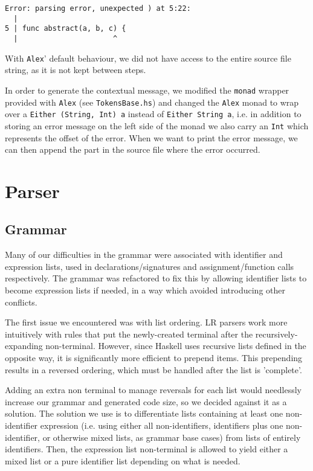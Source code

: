 \documentclass[11pt]{article}
\begin{document}
\begin{verbatim}
Error: parsing error, unexpected ) at 5:22:
  |
5 | func abstract(a, b, c) {
  |                      ^
\end{verbatim}

With \texttt{Alex}' default behaviour, we did not have access to the entire
source file string, as it is not kept between steps.

In order to generate the contextual message, we modified the \texttt{monad}
wrapper provided with \texttt{Alex} (see \texttt{TokensBase.hs}) and changed the
\texttt{Alex} monad to wrap over a \texttt{Either (String, Int) a} instead of
\texttt{Either String a}, i.e. in addition to storing an error message on
the left side of the monad we also carry an \texttt{Int} which represents
the offset of the error. When we want to print the error
message, we can then append the part in the source file where
the error occurred.
\section{Parser}
\label{sec:org30b4d1b}
\subsection{Grammar}
\label{sec:org5699611}
Many of our difficulties in the grammar were associated with identifier and
expression lists, used in declarations/signatures and assignment/function
calls respectively. The grammar was refactored to fix this by allowing
identifier lists to become expression lists if needed, in a way which
avoided introducing other conflicts.

The first issue we encountered was with list ordering. LR parsers
work more intuitively with rules that put the newly-created terminal
after the recursively-expanding non-terminal. However, since Haskell
uses recursive lists defined in the opposite way, it is significantly
more efficient to prepend items. This prepending results in a reversed
ordering, which must be handled after the list is 'complete'.

Adding an extra non terminal to manage reversals for each list would
needlessly increase our grammar and generated code size, so we decided
against it as a solution. The solution we use is to differentiate
lists containing at least one non-identifier expression (i.e. using either
all non-identifiers, identifiers plus one non-identifier, or otherwise mixed
lists, as grammar base cases) from lists of entirely identifiers. Then,
the expression list non-terminal is allowed to yield either a mixed list
or a pure identifier list depending on what is needed.
\end{document}
